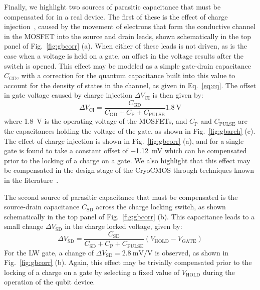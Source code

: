 Finally, we highlight two sources of parasitic capacitance that must be compensated for in a real device. The first of these is the effect of charge injection~\cite{1052859}, caused by the movement of electrons that form the conductive channel in the MOSFET into the source and drain leads, shown schematically in the top panel of Fig.~\ref{fig:gbcorr} (a). When either of these leads is not driven, as is the case when a voltage is held on a gate, an offset in the voltage results after the switch is opened. This effect may be modeled as a simple gate-drain capacitance $C_\textrm{GD}$, with a correction for the quantum capacitance built into this value to account for the density of states in the channel, as given in Eq.~\ref{eq:cq}. The offset in gate voltage caused by charge injection $\Delta V_\textrm{CI}$ is then given by:
\begin{equation}
  \Delta V_\textrm{CI} = \frac{C_\textrm{GD}}{C_\textrm{GD} + C_\textrm{P} + C_\textrm{PULSE}} \SI{1.8}{\volt}
\end{equation}
where \SI{1.8}{\volt} is the operating voltage of the MOSFETs, and $C_\textrm{P}$ and $C_\textrm{PULSE}$ are the capacitances holding the voltage of the gate, as shown in Fig.~\ref{fig:gbarch} (c). The effect of charge injection is shown in Fig.~\ref{fig:gbcorr} (a), and for a single gate is found to take a constant offset of \SI{-1.12}{\milli\volt} which can be compensated prior to the locking of a charge on a gate. We also highlight that this effect may be compensated in the design stage of the CryoCMOS through techniques known in the literature~\cite{45719}.

The second source of parasitic capacitance that must be compensated is the source-drain capacitance $C_\textrm{SD}$ across the charge locking switch, as shown schematically in the top panel of Fig.~\ref{fig:gbcorr} (b). This capacitance leads to a small change $\Delta V_\textrm{SD}$ in the charge locked voltage, given by:
\begin{equation}
  \Delta V_\textrm{SD} = \frac{C_\textrm{SD}}{C_\textrm{SD} + C_\textrm{P} + C_\textrm{PULSE}} (V_\textrm{HOLD} - V_\textrm{GATE})
\end{equation}
For the LW gate, a change of $\Delta V_\textrm{SD} = \SI[per-mode=symbol]{2.8}{\milli\volt\per\volt}$ is observed, as shown in Fig.~\ref{fig:gbcorr} (b). Again, this effect may be trivially compensated prior to the locking of a charge on a gate by selecting a fixed value of $V_\textrm{HOLD}$ during the operation of the qubit device.

